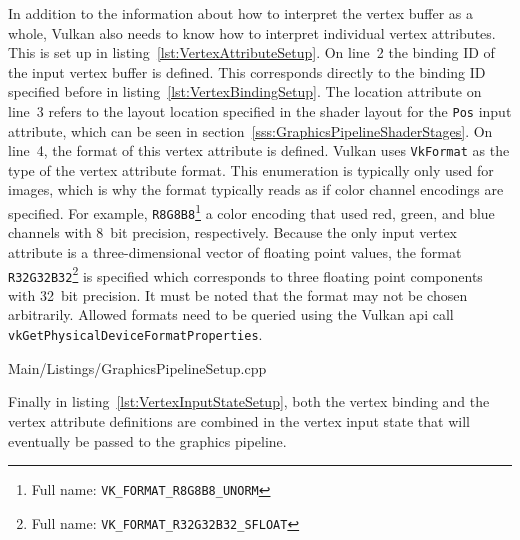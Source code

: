         In addition to the information about how to interpret the vertex buffer as a whole, Vulkan also needs to know how to interpret individual vertex attributes.
        This is set up in listing~\ref{lst:VertexAttributeSetup}.
        On line~2 the binding ID of the input vertex buffer is defined.
        This corresponds directly to the binding ID specified before in listing~\ref{lst:VertexBindingSetup}.
        The location attribute on line~3 refers to the layout location specified in the shader layout for the \lstinline{Pos} input attribute, which can be seen in section~\ref{sss:GraphicsPipelineShaderStages}.
        On line~4, the format of this vertex attribute is defined.
        Vulkan uses \lstinline{VkFormat} as the type of the vertex attribute format.
        This enumeration is typically only used for images, which is why the format typically reads as if color channel encodings are specified.
        For example, \lstinline{R8G8B8}\footnote{Full name: \lstinline{VK_FORMAT_R8G8B8_UNORM}} a color encoding that used red, green, and blue channels with 8~bit precision, respectively.
        Because the only input vertex attribute is a three-dimensional vector of floating point values, the format \lstinline{R32G32B32}\footnote{Full name: \lstinline{VK_FORMAT_R32G32B32_SFLOAT}} is specified which corresponds to three floating point components with 32~bit precision.
        It must be noted that the format may not be chosen arbitrarily.
        Allowed formats need to be queried using the Vulkan \gls{api} call \lstinline{vkGetPhysicalDeviceFormatProperties}.

        
        {Main/Listings/GraphicsPipelineSetup.cpp}

        Finally in listing~\ref{lst:VertexInputStateSetup}, both the vertex binding and the vertex attribute definitions are combined in the vertex input state that will eventually be passed to the graphics pipeline.



